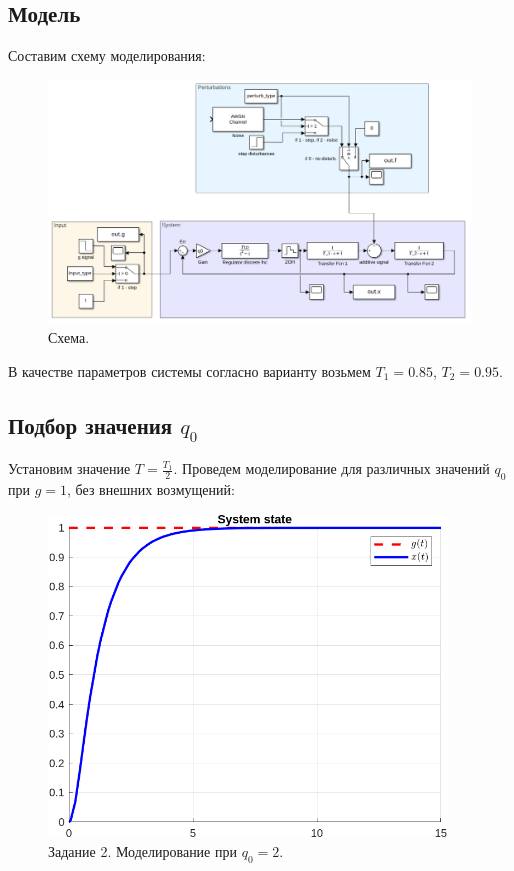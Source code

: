\documentclass[a4paper, 14pt]{extarticle}
\theoremstyle{definition}
\theoremstyle{plain}
\theoremstyle{remark}
\begin{document}
\subsection{Модель}
Составим схему моделирования:
\begin{figure}
    [H]
    \centering
    \includegraphics[width=\textwidth]{images/scheme.png}
    \caption{Схема.}
    \label{fig:scheme}
\end{figure}
В качестве параметров системы согласно варианту возьмем $T_1 = 0.85$, $T_2 = 0.95$.

\subsection{Подбор значения $q_0$}
Установим значение $T = \frac{T_1}{2}$. Проведем моделирование для различных значений $q_0$ при $g=1$, без внешних возмущений:
\begin{figure}
    [H]
    \centering
    \includegraphics[width=300pt]{images/task2__q0_2_state.png}
    \caption{Задание 2. Моделирование при $q_0 = 2$.}
    \label{fig:task2__q0_2_state}
\end{figure}
\end{document}

